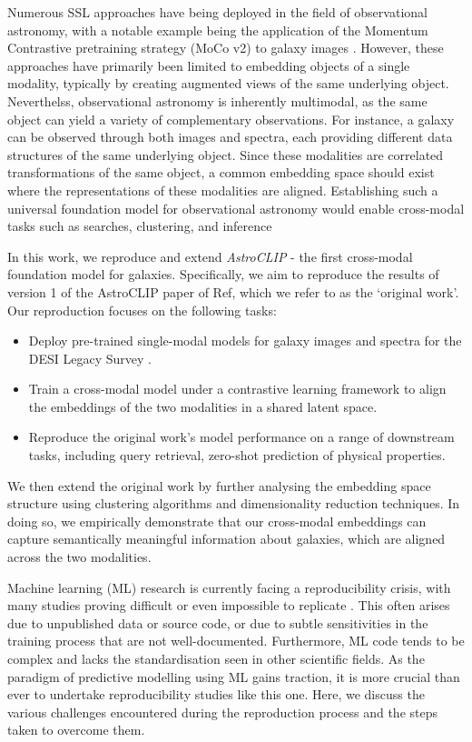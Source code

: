 \documentclass[a4paper,12pt]{article}
\begin{document}
Numerous SSL approaches have being deployed in the field of observational astronomy, with a notable example being the application of the Momentum Contrastive pretraining strategy (MoCo v2) to galaxy images \cite{stein}. However, these approaches have primarily been limited to embedding objects of a single modality, typically by creating augmented views of the same underlying object. Neverthelss, observational astronomy is inherently multimodal, as the same object can yield a variety of complementary observations. For instance, a galaxy can be observed through both images and spectra, each providing different data structures of the same underlying object. Since these modalities are correlated transformations of the same object, a common embedding space should exist where the representations of these modalities are aligned. Establishing such a universal foundation model for observational astronomy would enable cross-modal tasks such as searches, clustering, and inference

In this work, we reproduce and extend \emph{AstroCLIP} - the first cross-modal foundation model for galaxies. Specifically, we aim to reproduce the results of version 1 of the AstroCLIP paper of Ref\cite{astroclip}, which we refer to as the `original work'. Our reproduction focuses on the following tasks:
\begin{itemize}
    \item Deploy pre-trained single-modal models for galaxy images and spectra for the DESI Legacy Survey \cite{DESI}.
    \item Train a cross-modal model under a contrastive learning framework to align the embeddings of the two modalities in a shared latent space.
    \item Reproduce the original work's model performance on a range of downstream tasks, including query retrieval, zero-shot prediction of physical properties.
\end{itemize}
We then extend the original work by further analysing the embedding space structure using clustering algorithms and dimensionality reduction techniques. In doing so, we empirically demonstrate that our cross-modal embeddings can capture semantically meaningful information about galaxies, which are aligned across the two modalities.

Machine learning (ML) research is currently facing a reproducibility crisis, with many studies proving difficult or even impossible to replicate \cite{kapoor2023leakage}. This often arises due to unpublished data or source code, or due to subtle sensitivities in the training process that are not well-documented. Furthermore, ML code tends to be complex and lacks the standardisation seen in other scientific fields. As the paradigm of predictive modelling using ML gains traction, it is more crucial than ever to undertake reproducibility studies like this one. Here, we discuss the various challenges encountered during the reproduction process and the steps taken to overcome them.
\end{document}
